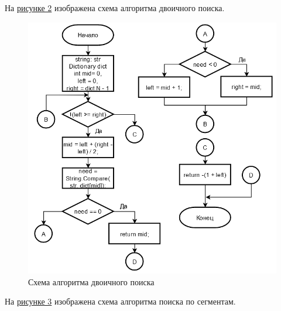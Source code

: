 \documentclass[14pt, a4paper]{extarticle}
\begin{document}
\clearpage
На \hyperref[Schema2]{рисунке 2} изображена схема алгоритма двоичного поиска.
\begin{figure}[h!]
	\centering
	\includegraphics[scale=0.85]{source/alg2.png}
	\caption{Схема алгоритма двоичного поиска}
	\label{Schema2}
\end{figure}
\clearpage
На \hyperref[Schema3]{рисунке 3} изображена схема алгоритма поиска по сегментам.
\end{document}

